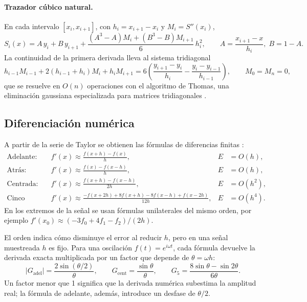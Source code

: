 \paragraph{Trazador cúbico natural.} En cada intervalo $[x_i, x_{i+1}]$, con $h_i = x_{i+1} - x_i$ y $M_i = S''(x_i)$,
\begin{equation}
  S_i(x) = A\,y_i + B\,y_{i+1} + \frac{(A^3 - A)M_i + (B^3 - B)M_{i+1}}{6}\,h_i^2,
  \qquad A = \frac{x_{i+1} - x}{h_i},\; B = 1 - A .
\end{equation}
La continuidad de la primera derivada lleva al sistema tridiagonal
\begin{equation}
  h_{i-1}M_{i-1} + 2(h_{i-1} + h_i)M_i + h_i M_{i+1}
  = 6\left(\frac{y_{i+1} - y_i}{h_i} - \frac{y_i - y_{i-1}}{h_{i-1}}\right),
  \qquad M_0 = M_n = 0 ,
  \label{eq:spline}
\end{equation}
que se resuelve en $O(n)$ operaciones con el algoritmo de Thomas, una eliminación gaussiana especializada para matrices tridiagonales \parencite{burden2017}.

\subsection{Diferenciación numérica}

A partir de la serie de Taylor se obtienen las fórmulas de diferencias finitas \parencite{chapra2015}:
\begin{align}
  \text{Adelante:}\quad & f'(x) \approx \frac{f(x+h) - f(x)}{h}, & E &= O(h), \\
  \text{Atrás:}\quad & f'(x) \approx \frac{f(x) - f(x-h)}{h}, & E &= O(h), \\
  \text{Centrada:}\quad & f'(x) \approx \frac{f(x+h) - f(x-h)}{2h}, & E &= O(h^2), \\
  \text{Cinco puntos:}\quad & f'(x) \approx \frac{-f(x+2h) + 8f(x+h) - 8f(x-h) + f(x-2h)}{12h}, & E &= O(h^4).
\end{align}
En los extremos de la señal se usan fórmulas unilaterales del mismo orden, por ejemplo $f'(x_0) \approx (-3f_0 + 4f_1 - f_2)/(2h)$.

El orden indica cómo disminuye el error al reducir $h$, pero en una señal muestreada $h$ es fijo. Para una oscilación $f(t) = e^{i\omega t}$, cada fórmula devuelve la derivada exacta multiplicada por un factor que depende de $\theta = \omega h$:
\begin{equation}
  |G_{\text{adel}}| = \frac{2\sin(\theta/2)}{\theta}, \qquad
  G_{\text{cent}} = \frac{\sin\theta}{\theta}, \qquad
  G_{5} = \frac{8\sin\theta - \sin 2\theta}{6\theta} .
  \label{eq:factor}
\end{equation}
Un factor menor que 1 significa que la derivada numérica subestima la amplitud real; la fórmula de adelante, además, introduce un desfase de $\theta/2$.

